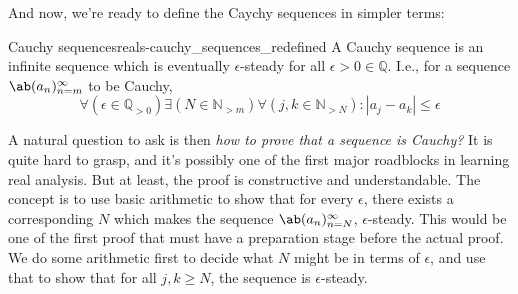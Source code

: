And now, we're ready to define the Caychy sequences in simpler terms:
\begin{cor}{Cauchy sequences}{reals-cauchy_sequences_redefined}
  A Cauchy sequence is an infinite sequence which is eventually \(\epsilon\)-steady for all
  $\epsilon > 0 \in \mathbb{Q}$. I.e., for a sequence $\sequence{a_n}{n = m}{\infty}$ to be Cauchy,
  \begin{equation*}
    \forall (\epsilon \in \mathbb{Q}_{>0}) \exists (N \in \mathbb{N}_{>m}) \forall (j, k \in \mathbb{N}_{>N}) : |a_j - a_k| \leq \epsilon
  \end{equation*}
\end{cor}

A natural question to ask is then \emph{how to prove that a sequence is Cauchy?} It
is quite hard to grasp, and it's possibly one of the first major roadblocks in learning real
analysis. But at least, the proof is constructive and understandable. The concept is to use basic
arithmetic to show that for every $\epsilon$, there exists a corresponding $N$ which
makes the sequence $\sequence{a_n}{n = N}{\infty}$, $\epsilon$-steady. This would be
one of the first proof that must have a preparation stage before the actual proof.
We do some arithmetic first to decide what $N$ might be in terms of $\epsilon$, and
use that to show that for all $j, k \geq N$, the sequence is $\epsilon$-steady.


